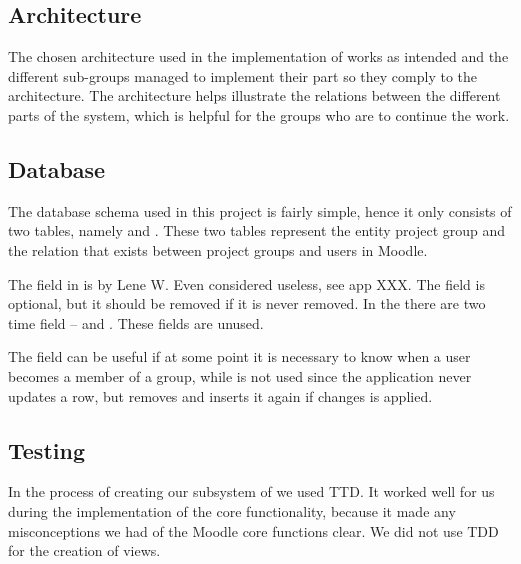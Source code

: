 

\subsection{Architecture}
The chosen architecture used in the implementation of \system{} works as intended and the different sub-groups managed to implement their part so they comply to the architecture. 
The architecture helps illustrate the relations between the different parts of the system, which is helpful for the groups who are to continue the work. 




\subsection{Database}
The database schema used in this project is fairly simple, hence it only consists of two tables, namely   and . 
These two tables represent the entity project group and the relation that exists between project groups and users in Moodle. 

The  field in  is by Lene W. Even considered useless, see app XXX. 
The field is optional, but it should be removed if it is never removed. 
In the  there are two time field --  and . 
These fields are unused. 

The field  can be useful if at some point it is necessary to know when a user becomes a member of a group, while  is not used since the application never updates a row, but removes and inserts it again if changes is applied. 



\subsection{Testing}
In the process of creating our subsystem of \system{} we used TTD.
It worked well for us during the implementation of the core functionality, because it made any misconceptions we had of the Moodle core functions clear.
We did not use TDD for the creation of views.

